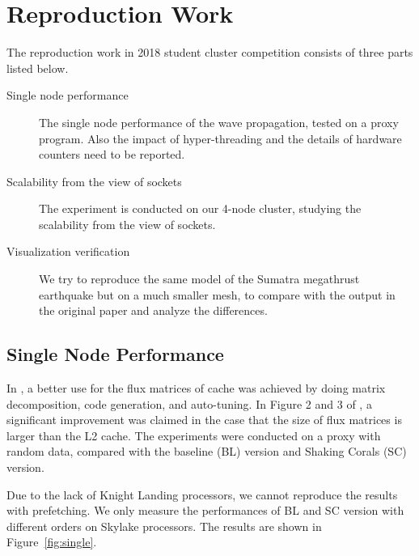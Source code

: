 \documentclass[5p,times]{sig-alternate-05-2015}
\begin{document}
\section{Reproduction Work}

The reproduction work in 2018 student cluster competition consists of three parts listed below. 

\begin{description}
\item [Single node performance] The single node performance of the wave propagation, tested on a proxy program. Also the impact of hyper-threading and the details of hardware counters need to be reported.

\item [Scalability from the view of sockets] The experiment is conducted on our 4-node cluster, studying the scalability from the view of sockets.

\item [Visualization verification] We try to reproduce the same model of the Sumatra megathrust earthquake but on a much smaller mesh, to compare with the output in the original paper and analyze the differences.
\end{description}

\subsection{Single Node Performance}

In \OriginalPaper, a better use for the flux matrices of cache was achieved by doing matrix decomposition, code generation, and auto-tuning. In Figure 2 and 3 of \OriginalPaper, a significant improvement was claimed in the case that the size of flux matrices is larger than the L2 cache. The experiments were conducted on a proxy with random data, compared with the baseline (BL) version and Shaking Corals (SC) version.

Due to the lack of Knight Landing processors, we cannot reproduce the results with prefetching. We only measure the performances of BL and SC version with different orders on Skylake processors. The results are shown in Figure~\ref{fig:single}.
\end{document}
